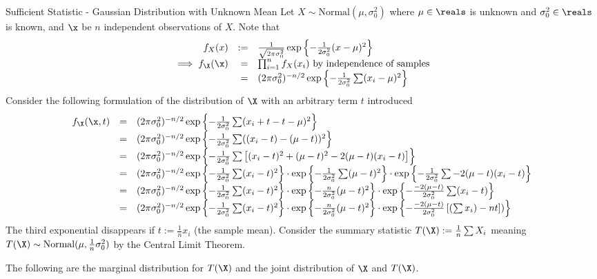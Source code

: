 \documentclass[11pt,a4paper]{article}
\begin{document}
  \begin{example}{Sufficient Statistic - Gaussian Distribution with Unknown Mean}
    Let $X\sim\text{Normal}(\mu,\sigma^2_0)$ where $\mu\in\reals$ is unknown and $\sigma^2_0\in\reals$ is known, and $\x$ be $n$ independent observations of $X$. Note that
    \[\begin{array}{rrl}
      f_X(x)&:=&\frac1{\sqrt{2\pi\sigma^2_0}}\exp\left\{-\frac1{2\sigma_0^2}(x-\mu)^2\right\}\\
      \implies f_\X(\x)&=&\prod_{i=1}^nf_X(x_i)\text{ by independence of samples}\\
      &=&(2\pi\sigma_0^2)^{-n/2}\exp\left\{-\frac1{2\sigma_0^2}\sum(x_i-\mu)^2\right\}
    \end{array}\]
    Consider the following formulation of the distribution of $\X$ with an arbitrary term $t$ introduced
    \[\begin{array}{rcl}
      f_\X(\x,t)&=&(2\pi\sigma_0^2)^{-n/2}\exp\left\{-\frac1{2\sigma_0^2}\sum(x_i+t-t-\mu)^2\right\}\\
      &=&(2\pi\sigma_0^2)^{-n/2}\exp\left\{-\frac1{2\sigma_0^2}\sum((x_i-t)-(\mu-t))^2\right\}\\
      &=&(2\pi\sigma_0^2)^{-n/2}\exp\left\{-\frac1{2\sigma_0^2}\sum\left[(x_i-t)^2+(\mu-t)^2-2(\mu-t)(x_i-t)\right]\right\}\\
      &=&(2\pi\sigma_0^2)^{-n/2}\exp\left\{-\frac1{2\sigma_0^2}\sum(x_i-t)^2\right\}\cdot\exp\left\{-\frac1{2\sigma_0^2}\sum(\mu-t)^2\right\}\cdot\exp\left\{-\frac1{2\sigma_0^2}\sum-2(\mu-t)(x_i-t)\right\}\\
      &=&(2\pi\sigma_0^2)^{-n/2}\exp\left\{-\frac1{2\sigma_0^2}\sum(x_i-t)^2\right\}\cdot\exp\left\{-\frac{n}{2\sigma_0^2}(\mu-t)^2\right\}\cdot\exp\left\{-\frac{-2(\mu-t)}{2\sigma_0^2}\sum(x_i-t)\right\}\\
      &=&(2\pi\sigma_0^2)^{-n/2}\exp\left\{-\frac1{2\sigma_0^2}\sum(x_i-t)^2\right\}\cdot\exp\left\{-\frac{n}{2\sigma_0^2}(\mu-t)^2\right\}\cdot\exp\left\{-\frac{-2(\mu-t)}{2\sigma_0^2}\left[\left(\sum x_i\right)-nt\right])\right\}\\
    \end{array}\]
    The third exponential disappears if $t:=\frac1nx_i$ (the sample mean). Consider the summary statistic $T(\X):=\frac1n\sum X_i$ meaning $T(\X)\sim\text{Normal}(\mu,\frac1n\sigma_0^2)$ by the Central Limit Theorem.
    \par The following are the marginal distribution for $T(\X)$ and the joint distribution of $\X$ and $T(\X)$.
    \[\begin{array}{rcl}

\end{array}\]
\end{example}
\end{document}

